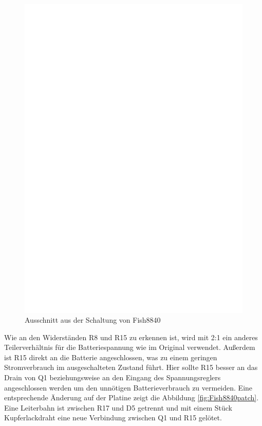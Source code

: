 \begin{figure}[H]
\centering
\includegraphics[width=12cm]{../FIG/Fish8840.eps}
\caption{Ausschnitt aus der Schaltung von Fish8840}
\label{fig:Fish8840}
\end{figure}

Wie an den Widerständen R8 und R15 zu erkennen ist, 
wird mit 2:1 ein anderes Teilerverhältnis für die Batteriespannung wie im Original verwendet.
Außerdem ist R15 direkt an die Batterie angeschlossen, was zu einem geringen Stromverbrauch im
ausgeschalteten Zustand führt. Hier sollte R15 besser an das Drain von Q1 beziehungsweise an den
Eingang des Spannungsreglers angeschlossen werden um den unnötigen Batterieverbrauch zu vermeiden.
Eine entsprechende Änderung auf der Platine zeigt die Abbildung \ref{fig:Fish8840patch}.
Eine Leiterbahn ist zwischen R17 und D5 getrennt und mit einem Stück Kupferlackdraht eine
neue Verbindung zwischen Q1 und R15 gelötet.

